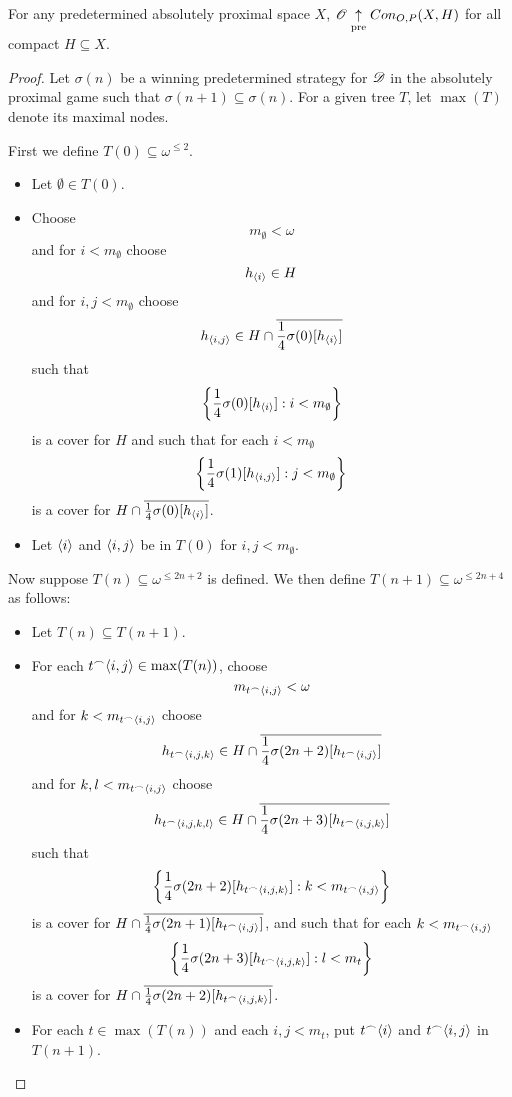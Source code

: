 \begin{theorem}
  For any predetermined absolutely proximal space $X$, 
  $\mathscr{O}\underset{\text{pre}}{\uparrow} Con_{O,P}(X,H)$ for all compact $H\subseteq X$.
\end{theorem}

\begin{proof}
  Let $\sigma(n)$ be a winning predetermined strategy for $\mathscr{D}$ in the 
  absolutely proximal game such that 
  $\sigma(n+1)\subseteq \sigma(n)$.
  For a given tree $T$, let $\max(T)$ denote its maximal nodes.

  \bigskip

  First we define $T(0)\subseteq \omega^{\leq 2}$.

  \begin{itemize}
    \item Let $\emptyset\in T(0)$.
    \item Choose 
      \[
        m_{\emptyset}<\omega
      \]
      and for $i<m_{\emptyset}$ choose
      \[
        h_{\langle i\rangle}\in H
      \]
      and for $i,j<m_{\emptyset}$ choose
      \[
        h_{\langle i,j\rangle}
          \in 
        H\cap\overline{\frac{1}{4}\sigma(0)[h_{\langle i\rangle}]}
      \]
      such that
        \[
          \left\{\frac{1}{4}\sigma(0)[h_{\langle i\rangle}]:i<m_{\emptyset}\right\}
        \]
      is a cover for $H$ and such that for each $i<m_{\emptyset}$
        \[
          \left\{\frac{1}{4}\sigma(1)[h_{\langle i,j\rangle}]:j<m_{\emptyset}\right\}
        \]
      is a cover for 
      $H\cap\overline{\frac{1}{4}\sigma(0)[h_{\langle i\rangle}]}$.
    \item Let $\langle i\rangle$ and $\langle i,j\rangle$ be in $T(0)$ for $i,j<m_{\emptyset}$.
  \end{itemize}

  \bigskip

  Now suppose $T(n)\subseteq \omega^{\leq 2n+2}$ is defined. 
  We then define $T(n+1)\subseteq \omega^{\leq 2n+4}$ as follows:

  \begin{itemize}
    \item Let $T(n)\subseteq T(n+1)$.
    \item For each $t{^\frown}\langle i,j\rangle\in\max(T(n))$, choose 
        \[m_{t{^\frown}\langle i,j\rangle}<\omega\]
        and for $k<m_{t{^\frown}\langle i,j\rangle}$ choose 
          \[
            h_{t{^\frown}\langle i,j,k\rangle}
              \in 
            H\cap \overline{\frac{1}{4}\sigma(2n+2)[h_{t{^\frown}\langle i,j\rangle}]}
          \]
        and for $k,l<m_{t{^\frown}\langle i,j\rangle}$ choose
          \[
            h_{t{^\frown}\langle i,j,k,l\rangle} 
              \in 
            H\cap\overline{\frac{1}{4}\sigma(2n+3)[h_{t{^\frown}\langle i,j,k\rangle}]}
          \]
        such that
      \[
        \left\{\frac{1}{4}\sigma(2n+2)[h_{t{^\frown}\langle i,j,k\rangle}]
          :
        k<m_{t{^\frown}\langle i,j\rangle}\right\}
      \]
    is a cover for $H\cap \overline{\frac{1}{4}\sigma(2n+1)[h_{t{^\frown}\langle i,j\rangle}]}$, 
    and such that for each $k<m_{t{^\frown}\langle i,j\rangle}$
      \[
        \left\{\frac{1}{4}\sigma(2n+3)[h_{t{^\frown}\langle i,j,k\rangle}]:l<m_t\right\}
      \]
    is a cover for $H\cap\overline{\frac{1}{4}\sigma(2n+2)[h_{t{^\frown}\langle i,j,k\rangle}]}$.
    \item For each $t\in\max(T(n))$ and each $i,j<m_t$, put $t{^\frown}\langle i\rangle$
      and $t{^\frown}\langle i,j\rangle$ in $T(n+1)$.
  \end{itemize}


\end{proof}

